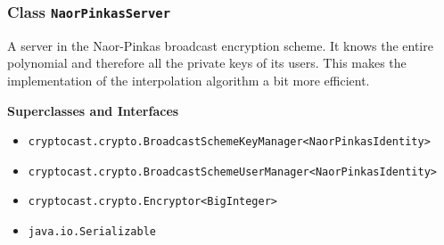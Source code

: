 \subsubsection{Class \lstinline|NaorPinkasServer|}
A server in the Naor-Pinkas broadcast encryption scheme. It knows
 the entire polynomial and therefore all the private keys of its users. This makes the implementation
 of the interpolation algorithm a bit more efficient. \\
\noindent\begin{minipage}[t]{5cm}
\vspace{0.3em}
\hspace*{2em}
\vspace{0.3em}
\end{minipage}



\textbf{\sffamily Superclasses and Interfaces}
\begin{itemize}
\item \lstinline|cryptocast.crypto.BroadcastSchemeKeyManager<NaorPinkasIdentity>|
\item \lstinline|cryptocast.crypto.BroadcastSchemeUserManager<NaorPinkasIdentity>|
\item \lstinline|cryptocast.crypto.Encryptor<BigInteger>|
\item \lstinline|java.io.Serializable|
\end{itemize}



